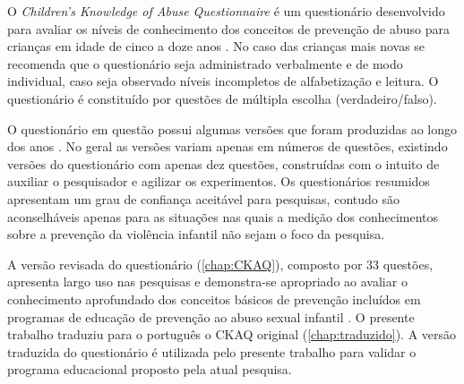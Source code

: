 \vspace{-0.1cm}

O \textit{Children’s Knowledge of Abuse Questionnaire} é um questionário desenvolvido para avaliar os níveis de conhecimento dos conceitos de prevenção de abuso para crianças em idade de cinco a doze anos \cite{tutty1992ability}. No caso das crianças mais novas se recomenda que o questionário seja administrado verbalmente e de modo individual, caso seja observado níveis incompletos de alfabetização e leitura. O questionário é constituído por questões de múltipla escolha (verdadeiro/falso).

\vspace{-0.1cm}

O questionário em questão possui algumas versões que foram produzidas ao longo dos anos \cite{tutty1995revised, tutty2019children}. No geral as versões variam apenas em números de questões, existindo versões do questionário com apenas dez questões, construídas com o intuito de auxiliar o pesquisador e agilizar os experimentos. Os questionários resumidos apresentam um grau de confiança aceitável para pesquisas, contudo são aconselháveis apenas para as situações nas quais a medição dos conhecimentos sobre a prevenção da violência infantil não sejam o foco da pesquisa. 



\vspace{-0.1cm}

A versão revisada do questionário (\autoref{chap:CKAQ}), composto por 33 questões, apresenta largo uso nas pesquisas e demonstra-se apropriado ao avaliar o conhecimento aprofundado dos conceitos básicos de prevenção incluídos em programas de educação de prevenção ao abuso sexual infantil \cite{tutty1992ability}. O presente trabalho traduziu para o português o CKAQ original (\autoref{chap:traduzido}). A versão traduzida do questionário é utilizada pelo presente trabalho para validar o programa educacional proposto pela atual pesquisa.%



